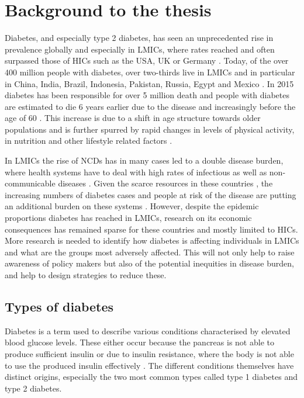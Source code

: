 
\section{Background to the thesis}

Diabetes, and especially type 2 diabetes, has seen an unprecedented rise in prevalence globally and especially in \acp{LMIC}, where rates reached and often surpassed those of \acp{HIC} such as the USA, UK or Germany \parencite{Risk2016,Hu2011}. Today, of the over 400 million people with diabetes, over two-thirds live in \acp{LMIC} \parencite{InternationalDiabetesFederation2013} and in particular in China, India, Brazil, Indonesia, Pakistan, Russia, Egypt and Mexico \parencite{Risk2016}. In 2015 diabetes has been responsible for over 5 million death and people with diabetes are estimated to die 6 years earlier due to the disease and increasingly before the age of 60 \parencite{InternationalDiabetesFederation2015,Seshasai2011}. This increase is due to a shift in age structure towards older populations and is further spurred by rapid changes in levels of physical activity, in nutrition and other lifestyle related factors \parencite{Risk2016,Hu2011}.

In \acp{LMIC} the rise of \acp{NCD} has in many cases led to a double disease burden, where health systems have to deal with high rates of infectious as well as non-communicable diseases \parencite{Jamison2013}. Given the scarce resources in these countries \parencite{Mills2014}, the increasing numbers of diabetes cases and people at risk of the disease are putting an additional burden on these systems \parencite{Wareham2016,Chan2016}. However, despite the epidemic proportions diabetes has reached in \acp{LMIC}, research on its economic consequences has remained sparse for these countries and mostly limited to \acp{HIC}. More research is needed to identify how diabetes is affecting individuals in \acp{LMIC} and what are the groups most adversely affected. This will not only help to raise awareness of policy makers but also of the potential inequities in disease burden, and help to design strategies to reduce these.

 
\subsection{Types of diabetes}

Diabetes is a term used to describe various conditions characterised by elevated blood glucose levels. These either occur because the pancreas is not able to produce sufficient insulin or due to insulin resistance, where the body is not able to use the produced insulin effectively \parencite{WorldHealthOrganization2016}. The different conditions themselves have distinct origins, especially the two most common types called type 1 diabetes and type 2 diabetes. 

